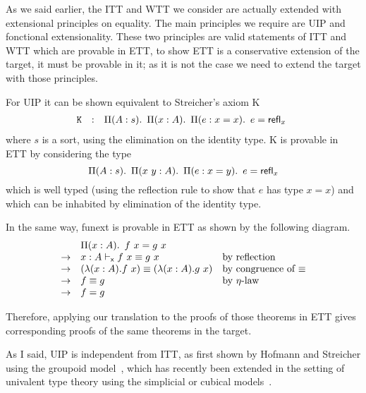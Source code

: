 As we said earlier, the \acrshort{ITT} and \acrshort{WTT} we consider are
actually extended with extensional principles on equality.
The main principles we require are \acrshort{UIP} and fonctional extensionality.
These two principles are valid statements of \acrshort{ITT} and \acrshort{WTT}
which are provable in \acrshort{ETT}, to show \acrshort{ETT} is a conservative
extension of the target, it must be provable in it; as it is not the case we need
to extend the target with those principles.

For \acrshort{UIP} it can be shown equivalent to Streicher's axiom K
\[
\begin{array}{rcl}
  \mathtt{K} & : & \mathop{\Pi(A: s).\ } \mathop{\Pi(x :A).\ } \mathop{\Pi(e : x = x).\ } e = {\mathsf{refl}}_{x}\  \\
\end{array}
\]
where \(s\) is a sort, using the elimination on the identity type.
K is provable in \acrshort{ETT} by considering the type
\[
  \mathop{\Pi(A: s).\ } \mathop{\Pi(x \ y:A).\ } \mathop{\Pi(e : x = y).\ } e = {\mathsf{refl}}_{x}\  \\
\]
which is well typed (using the reflection rule to show that $e$ has
type $x= x$) and which can be inhabited by elimination of the identity
type.

In the same way, \acrshort{funext} is provable in \acrshort{ETT} as shown by the
following diagram.
\[
\begin{array}{cll}
  &\mathop{\Pi(x : A).\ } f\ x = g\ x \\
  \to & x : A \vdash_{\mathsf{x}} f\ x \equiv g\ x &
  \mbox{by reflection} \\
  \to &  (\lambda (x:A). {f \ x}) \equiv (\lambda{(x:A)}.{g \ x}) &
  \mbox{by congruence of $\equiv$} \\
  \to &  f \equiv g & \mbox{by $\eta$-law} \\
  \to &  f = g
\end{array}
\]

Therefore, applying our translation to the proofs of those theorems in
\acrshort{ETT} gives corresponding proofs of the same theorems in the target.

As I said, \acrshort{UIP} is independent from \acrshort{ITT}, as first shown by
Hofmann and Streicher using the groupoid model~, which
has recently been extended in the setting of univalent type theory using the
simplicial or cubical models~.

